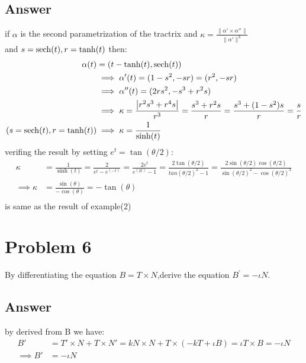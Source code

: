 \documentclass[
	12pt, %
]{fphw}
\theoremstyle{plain}
\begin{document}
\subsection*{Answer}
     if $\alpha$ is the second parametrization of the tractrix and $\kappa = \frac{\parallel{\alpha' \times \alpha''}\parallel}{\parallel\alpha'\parallel^3}$\\
     and $s = \sech(t),r = \tanh(t)$ then:\\
     \begin{align*}
          \alpha(t) &= (t - \tanh(t),\sech(t))\\
          &\implies\alpha'(t) = (1 - s^2,-sr) = (r^2,-sr)\\
          &\implies\alpha''(t) = (2rs^2,-s^3 + r^2s)\\
          &\implies\kappa = \frac{\abs{r^2s^3 + r^4s}}{r^3} = \frac{s^3 + r^2s}{r} = \frac{s^3 + (1-s^2)s}{r} = \frac{s}{r}\\
          (s = \sech(t),r = \tanh(t))&\implies\kappa = \frac{1}{\sinh(t)}
     \end{align*}
     verifing the result by setting $e^t = \tan(\theta/2)$:
     \begin{align*}
          \kappa &= \frac{1}{\sinh(t)} = \frac{2}{e^t - e^(-t)} = \frac{2e^t}{e^(2t) - 1} = \frac{2\tan(\theta/2)}{tan(\theta/2)^2 - 1} = \frac{2\sin(\theta/2)\cos(\theta/2)}{\sin(\theta/2)^2 - \cos(\theta/2)^2}\\
          \implies\kappa &=  \frac{\sin(\theta)}{-\cos(\theta)} = -\tan(\theta)\\
     \end{align*}
     is same as the result of example(2)

\section*{Problem 6}
\begin{problem}
     By differentiating the equation \(B = T \times N\),derive the equation \(B^{'} = -\iota N\).
\end{problem}

\subsection*{Answer}
by derived from B we have:
\begin{align*}
     B' &= T' \times N + T \times N' = kN \times N + T \times (-kT + \iota B) = \iota T \times B = -\iota N\\
     \implies B' &= -\iota N\\
\end{align*}
\end{document}

